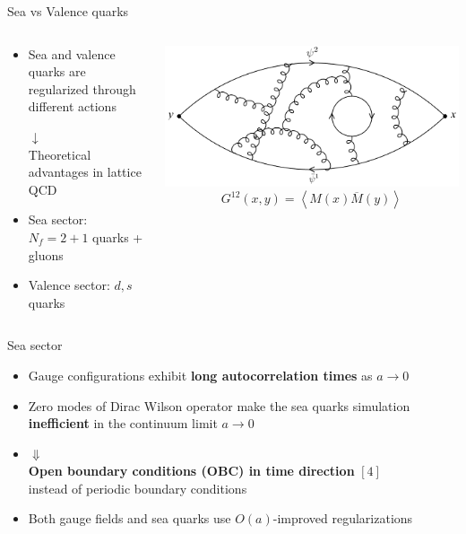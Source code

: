 \documentclass{beamer}
\newcommand{\la}{\langle}
\newcommand{\ra}{\rangle}
\begin{document}
\begin{frame}{Sea vs Valence quarks}
      \begin{columns}
            \begin{column}{0.5\textwidth}
                  \begin{itemize}
                        \item Sea and valence quarks are regularized through different actions
                        \begin{center}
                              $\downarrow$\\Theoretical advantages in lattice QCD
                        \end{center}
                        \item Sea sector: $N_f = 2+1$ quarks + gluons
                        \item Valence sector: $d,s$ quarks
                  \end{itemize}
            \end{column}
            \begin{column}{0.45\textwidth}
                  \includegraphics[width=\textwidth]{assets/confinement_bis.png}
                  $$G^{12}(x,y) = \left\la M(x)\overline M(y) \right\ra$$
            \end{column}
      \end{columns}
\end{frame}

\begin{frame}{Sea sector}
      \begin{itemize}%
            \item Gauge configurations exhibit {\bf long autocorrelation times} as $a\rightarrow 0$
            \item Zero modes of Dirac Wilson operator make the sea quarks simulation {\bf inefficient} in the continuum limit $a\rightarrow 0$
            \item[]\begin{center}
                  $\Downarrow$\\
                  {\bf Open boundary conditions (OBC) in time direction} $[4]$\\
                  instead of periodic boundary conditions
                  \end{center}\vspace{\baselineskip}
            \item Both gauge fields and sea quarks use $O(a)$-improved regularizations
      \end{itemize}
\end{frame}
\end{document}
